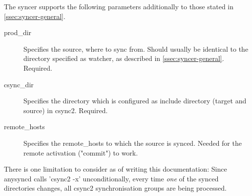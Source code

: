 The syncer supports the following parameters additionally to those
stated in \ref{ssec:syncer-general}.

\begin{description}
    \item[prod_dir] Specifies the source, where to sync from. Should usually be
        identical to the directory specified as watcher, as described in
        \ref{ssec:syncer-general}. Required.

    \item[csync_dir] Specifies the directory which is configured as include
        directory (target and source) in csync2. Required.

    \item[remote_hosts] Specifies the remote_hosts to which the source is
        synced. Needed for the remote activation ("commit") to work.
\end{description}


There is one limitation to consider as of writing this documentation: Since
anysyncd calls 'csync2 -x' unconditionally, every time \textit{one} of the synced
directories changes, all csync2 synchronisation groups
are being processed.

